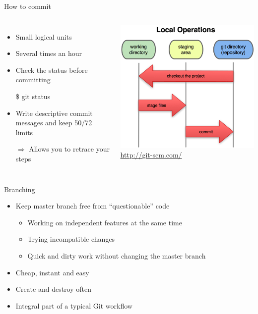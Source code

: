 \documentclass{beamer}
\newenvironment{shell}[1][\linewidth]
  {\begin{mdframed}[
  skipabove=\topsep,
  skipbelow=\topsep,
  font=\ttfamily,
  linecolor=black!9,
  backgroundcolor=black!9,
  innertopmargin=6pt,
  innerbottommargin=6pt,
  innerleftmargin=6pt,
  innerrightmargin=6pt,
  userdefinedwidth=#1]}
  {\end{mdframed}}
\begin{document}
\begin{frame}{How to commit}
  \begin{columns}[T,onlytextwidth]
  \begin{itemize}
    \item Small logical units
    \item Several times an hour
    \item Check the status before committing
      \begin{shell}
	\$ git status
      \end{shell}
    \item Write descriptive commit messages and keep 50/72 limits
		\item[$\Rightarrow$] Allows you to retrace your steps
   \end{itemize}
    \includegraphics[width=\textwidth]{images/18333fig0106-tn.png}\\
    {\small \url{http://git-scm.com/}}
  \end{columns}
 \end{frame}

\begin{frame}{Branching}
  \begin{itemize}
		\item Keep master branch free from ``questionable'' code
			\begin{itemize}
				\item Working on independent features at the same time
				\item Trying incompatible changes
				\item Quick and dirty work without changing the master branch
			\end{itemize}
		\item Cheap, instant and easy
		\item Create and destroy often
		\item Integral part of a typical Git workflow
  \end{itemize}
\end{frame}
\end{document}
